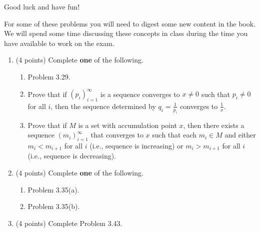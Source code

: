 \documentclass[11pt]{article}
\theoremstyle{definition}
\begin{document}
Good luck and have fun!

\newpage

For some of these problems you will need to digest some new content in the book.  We will spend some time discussing these concepts in class during the time you have available to work on the exam.

\begin{enumerate}

\item (4 points) Complete \textbf{one} of the following.
\begin{enumerate}
\item Problem 3.29.
\item Prove that if $(p_i)_{i=1}^{\infty}$ is a sequence converges to $x\neq 0$ such that $p_i\neq 0$ for all $i$, then the sequence determined by $q_i=\frac{1}{p_i}$ converges to $\frac{1}{x}$.
\item Prove that if $M$ is a set with accumulation point $x$, then there exists a sequence $(m_i)_{i=1}^{\infty}$ that converges to $x$ such that each $m_i\in M$ and either $m_i<m_{i+1}$ for all $i$ (i.e., sequence is increasing) or $m_i>m_{i+1}$ for all $i$ (i.e., sequence is decreasing). %

\end{enumerate}

\item (4 points) Complete \textbf{one} of the following.
\begin{enumerate}
\item Problem 3.35(a).
\item Problem 3.35(b).
\end{enumerate}

\item (4 points) Complete Problem 3.43.

\end{enumerate}
\end{document}

